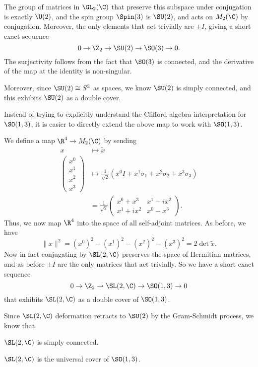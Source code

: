 \documentclass[a4paper]{article}
\begin{document}
The group of matrices in $\GL_2(\C)$ that preserve this subspace under conjugation is exactly $\U(2)$, and the spin group $\Spin(3)$ is $\SU(2)$, and acts on $M_2(\C)$ by conjugation. Moreover, the only elements that act trivially are $\pm I$, giving a short exact sequence
\[
  0 \to \Z_2 \to \SU(2) \to \SO(3) \to 0.
\]
The surjectivity follows from the fact that $\SO(3)$ is connected, and the derivative of the map at the identity is non-singular.

Moreover, since $\SU(2) \cong S^3$ as spaces, we know $\SU(2)$ is simply connected, and this exhibits $\SU(2)$ as a double cover.

Instead of trying to explicitly understand the Clifford algebra interpretation for $\SO(1, 3)$, it is easier to directly extend the above map to work with $\SO(1, 3)$.

We define a map $\R^4 \to M_2(\C)$ by sending
\begin{align*}
  x &\mapsto \tilde{x}\\
  \begin{pmatrix}
    x^0\\x^1\\x^2\\x^3
  \end{pmatrix}&\mapsto
  \frac{1}{\sqrt{2}}(x^0 I + x^1 \sigma_1 + x^2 \sigma_2 + x^3 \sigma_3) \\
  &= \frac{1}{\sqrt{2}}
  \begin{pmatrix}
    x^0 + x^3 & x^1 - ix^2\\
    x^1 + i x^2 & x^0-x^3
  \end{pmatrix}.
\end{align*}
Thus, we now map $\R^4$ into the space of all self-adjoint matrices. As before, we have
\[
  \|x\|^2 = (x^0)^2 - (x^1)^2 - (x^2)^2 - (x^3)^2 = 2\det \tilde{x}.
\]
Now in fact conjugating by $\SL(2, \C)$ preserves the space of Hermitian matrices, and as before $\pm I$ are the only matrices that act trivially. So we have a short exact sequence
\[
  0 \to \Z_2 \to \SL(2, \C) \to \SO(1, 3) \to 0
\]
that exhibits $\SL(2, \C)$ as a double cover of $\SO(1, 3)$.

Since $\SL(2, \C)$ deformation retracts to $\SU(2)$ by the Gram-Schmidt process, we know that
\begin{prop}
  $\SL(2, \C)$ is simply connected.
\end{prop}

\begin{cor}
  $\SL(2, \C)$ is the universal cover of $\SO(1, 3)$.
\end{cor}
\end{document}
